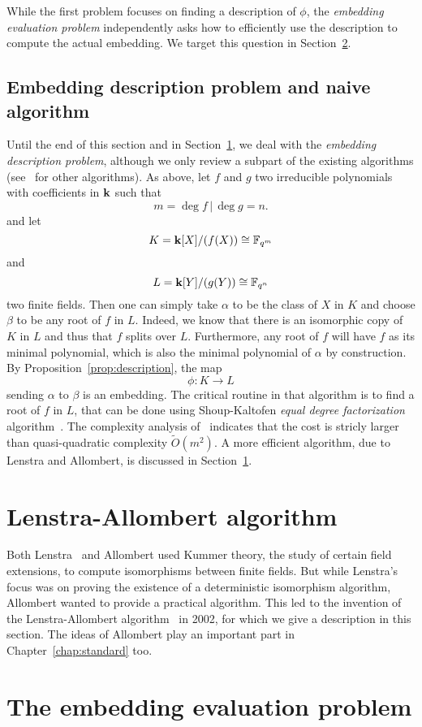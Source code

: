 While the first problem focuses on finding a description of $\phi$, the
\emph{embedding evaluation problem} independently asks how to efficiently use
the description to compute the actual embedding. We target this question in
Section~\ref{sec:evaluation}.

\subsection{Embedding description problem and naive algorithm}

Until the end of this section and in Section~\ref{sec:allombert}, we deal with
the \emph{embedding description problem}, although we only review a subpart of
the existing algorithms (see~\cite{BDDFS17} for other algorithms). As above, let
$f$ and $g$ two irreducible polynomials with coefficients in $\mathbf{k}$ such that
\[
  m=\deg f\,|\,\deg g=n.
\]
and let
\[
  K=\mathbf{k}[X]/(f(X))\cong\mathbb{F}_{q^m}
\]
and
\[
  L = \mathbf{k}[Y]/(g(Y))\cong\mathbb{F}_{q^n}
\]
two finite fields. Then one can simply take $\alpha$ to be the class of $X$ in
$K$ and choose $\beta$ to be any root of $f$ in $L$. Indeed, we know that there
is an isomorphic copy of $K$ in $L$ and thus that $f$ splits over $L$.
Furthermore, any root of $f$ will have $f$ as its minimal polynomial, which is
also the minimal polynomial of $\alpha$ by construction. By
Proposition~\ref{prop:description}, the map 
\[
  \phi:K\to L
\]
sending $\alpha$ to $\beta$ is an embedding. The critical routine in that
algorithm is to find a root of $f$ in $L$, that can be done using Shoup-Kaltofen
\emph{equal degree factorization} algorithm~\cite{KS97}. The complexity analysis
of~\cite{BDDFS17} indicates that the cost is stricly larger than quasi-quadratic
complexity $\tilde O(m^2)$. A more efficient algorithm, due to Lenstra and
Allombert, is discussed in Section~\ref{sec:allombert}.

\section{Lenstra-Allombert algorithm}
\label{sec:allombert}

Both Lenstra~\cite{Lenstra91} and Allombert used
Kummer theory, the study of certain field extensions, to compute isomorphisms
between finite fields. But while Lenstra's focus
was on proving the existence of a deterministic isomorphism algorithm, Allombert 
wanted to provide a practical algorithm. This led to the invention of the
Lenstra-Allombert algorithm~\cite{Allombert02} in 2002, for which we give a
description in this section. The ideas of Allombert play an important part in
Chapter~\ref{chap:standard} too.

\section{The embedding evaluation problem}
\label{sec:evaluation}

